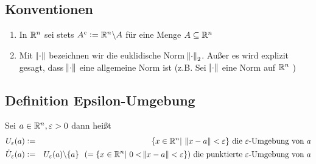 \subsection{Konventionen}
\begin{enumerate}[label= (\alph*)]
    \item In $\mathbb{R}^n$ sei stets $A^c := \mathbb{R}^n \backslash A$ für eine Menge $A \subseteq \mathbb{R}^n$
    \item Mit $\norm{\cdot}$ bezeichnen wir die euklidische Norm $\norm{\cdot}_2$.
    Außer es wird explizit gesagt, dass $\norm{\cdot}$ eine allgemeine Norm ist
    (z.B. \glqq{} Sei $\norm{\cdot}$ eine Norm   auf $\mathbb{R}^n$ \grqq{})
\end{enumerate}

\subsection{Definition Epsilon-Umgebung}
Sei $a \in \mathbb{R}^n, \varepsilon > 0$ dann heißt
\begin{eqnarray*}
    U_\varepsilon(a) &:=& \{ x \in \mathbb{R}^n |\ \norm{x-a} < \varepsilon \} \text{ die }
    \varepsilon \text{-Umgebung von }a\\
    \dot{U}_\varepsilon(a) &:=& U_\varepsilon(a) \backslash \{a \}
    \ \ ( =\{ x \in \mathbb{R}^n |\ 0<\norm{x-a}<\varepsilon \} ) \text{ die punktierte }
    \varepsilon \text{-Umgebung von }a
\end{eqnarray*}

